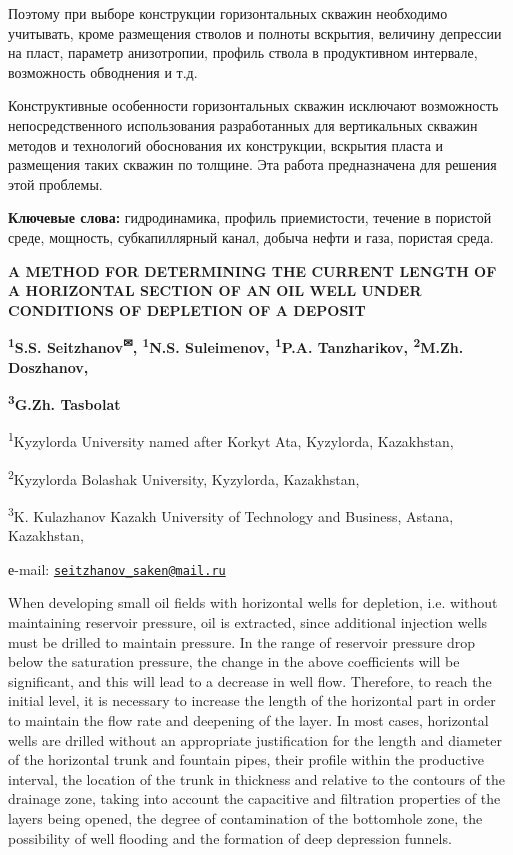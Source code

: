 Поэтому при выборе конструкции горизонтальных скважин необходимо
учитывать, кроме размещения стволов и полноты вскрытия, величину
депрессии на пласт, параметр анизотропии, профиль ствола в продуктивном
интервале, возможность обводнения и т.д.

Конструктивные особенности горизонтальных скважин исключают возможность
непосредственного использования разработанных для вертикальных скважин
методов и технологий обоснования их конструкции, вскрытия пласта и
размещения таких скважин по толщине. Эта работа предназначена для
решения этой проблемы.

{\bfseries Ключевые слова:} гидродинамика, профиль приемистости, течение в
пористой среде, мощность, субкапиллярный канал, добыча нефти и газа,
пористая среда.
\begin{articleheader}

{\bfseries A METHOD FOR DETERMINING THE CURRENT LENGTH OF A HORIZONTAL
SECTION OF AN OIL WELL UNDER CONDITIONS OF DEPLETION OF A DEPOSIT}

{\bfseries \textsuperscript{1}S.S. Seitzhanov\textsuperscript{✉},
\textsuperscript{1}N.S. Suleimenov, \textsuperscript{1}P.A. Tanzharikov,
\textsuperscript{2}M.Zh. Doszhanov,}

{\bfseries \textsuperscript{3}G.Zh. Tasbolat}
\end{articleheader}
\begin{affiliation}

\textsuperscript{1}Kyzylorda University named after Korkyt Ata,
Kyzylorda, Kazakhstan,

\textsuperscript{2}Kyzylorda Bolashak University, Kyzylorda, Kazakhstan,

\textsuperscript{3}K. Kulazhanov Kazakh University of Technology and
Business, Astana, Kazakhstan,

е-mail:
\href{mailto:seitzhanov_saken@mail.ru}{\nolinkurl{seitzhanov\_saken@mail.ru}}
\end{affiliation}

When developing small oil fields with horizontal wells for depletion,
i.e. without maintaining reservoir pressure, oil is extracted, since
additional injection wells must be drilled to maintain pressure. In the
range of reservoir pressure drop below the saturation pressure, the
change in the above coefficients will be significant, and this will lead
to a decrease in well flow. Therefore, to reach the initial level, it is
necessary to increase the length of the horizontal part in order to
maintain the flow rate and deepening of the layer. In most cases,
horizontal wells are drilled without an appropriate justification for
the length and diameter of the horizontal trunk and fountain pipes,
their profile within the productive interval, the location of the trunk
in thickness and relative to the contours of the drainage zone, taking
into account the capacitive and filtration properties of the layers
being opened, the degree of contamination of the bottomhole zone, the
possibility of well flooding and the formation of deep depression
funnels.

